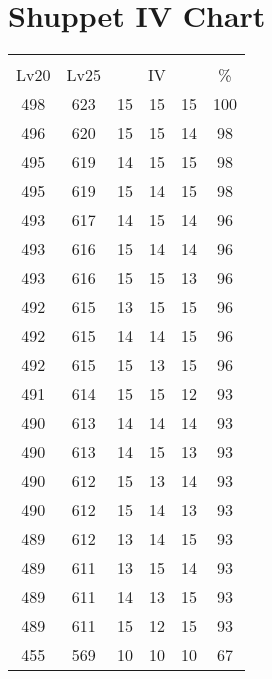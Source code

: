 \documentclass{article}%
\begin{document}
%
\normalsize%
\section{Shuppet IV Chart}%
\label{sec:Shuppet IV Chart}%
\renewcommand{\arraystretch}{1.5}%
\begin{tabular}{|c|c|c|c|c|c|}%
\hline%
\multicolumn{6}{|c|}{\textcolor{white}{ 
\linebreak{Shuppet}
}%
\cellcolor{black}}\\%
\multicolumn{1}{|c}{Lv20}&\multicolumn{1}{c|}{Lv25}&\multicolumn{3}{c|}{IV}&\multicolumn{1}{|c|}{\%}\\%
\hline%
\rowcolor{color100}%
498&623&15&15&15&100\\%
\hline%
\rowcolor{color98}%
496&620&15&15&14&98\\%
\hline%
\rowcolor{color98}%
495&619&14&15&15&98\\%
\hline%
\rowcolor{color98}%
495&619&15&14&15&98\\%
\hline%
\rowcolor{color96}%
493&617&14&15&14&96\\%
\hline%
\rowcolor{color96}%
493&616&15&14&14&96\\%
\hline%
\rowcolor{color96}%
493&616&15&15&13&96\\%
\hline%
\rowcolor{color96}%
492&615&13&15&15&96\\%
\hline%
\rowcolor{color96}%
492&615&14&14&15&96\\%
\hline%
\rowcolor{color96}%
492&615&15&13&15&96\\%
\hline%
\rowcolor{color93}%
491&614&15&15&12&93\\%
\hline%
\rowcolor{color93}%
490&613&14&14&14&93\\%
\hline%
\rowcolor{color93}%
490&613&14&15&13&93\\%
\hline%
\rowcolor{color93}%
490&612&15&13&14&93\\%
\hline%
\rowcolor{color93}%
490&612&15&14&13&93\\%
\hline%
\rowcolor{color93}%
489&612&13&14&15&93\\%
\hline%
\rowcolor{color93}%
489&611&13&15&14&93\\%
\hline%
\rowcolor{color93}%
489&611&14&13&15&93\\%
\hline%
\rowcolor{color93}%
489&611&15&12&15&93\\%
\hline%
\rowcolor{color91}%
455&569&10&10&10&67\\%
\end{tabular}

%
\end{document}
